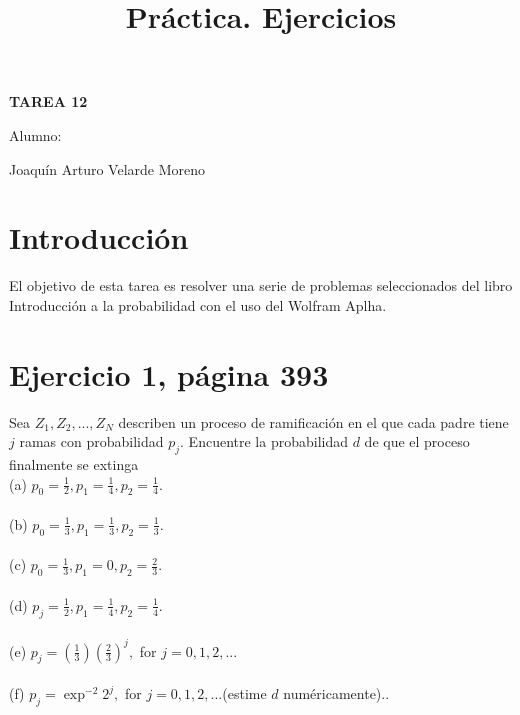 \documentclass[]{article}
\title{Práctica. Ejercicios}
\date{}
\begin{document}
	\maketitle
	\begin{center}


\centerline{\textbf{TAREA 12} } 
\textbf{ }

\centerline{Alumno: } 
\centerline{Joaquín Arturo Velarde Moreno}


	\end{center}
	

\section{Introducción}

El objetivo de esta tarea es resolver una serie de problemas seleccionados del libro Introducción a la probabilidad\cite{Material} con el uso del Wolfram Aplha\cite{wolf}.

\section{Ejercicio 1, página 393}


Sea $Z_{1}, Z_{2}, ..., Z_{N}$ describen un proceso de ramificación en el que cada padre tiene  $j$ ramas con probabilidad $p_{j}$. Encuentre la probabilidad  $d$ de que el proceso finalmente se extinga
\\
(a) $p_{0} = \frac{1}{2}, p_{1} = \frac{1}{4}, p_{2} = \frac{1}{4}$.\\
\\
(b) $p_{0} = \frac{1}{3}, p_{1} = \frac{1}{3}, p_{2} = \frac{1}{3}$.\\
\\
(c) $p_{0} = \frac{1}{3}, p_{1} = 0, p_{2} = \frac{2}{3}$.\\
\\
(d) $p_{j} = \frac{1}{2}, p_{1} = \frac{1}{4}, p_{2} = \frac{1}{4}$.\\
\\
(e) $p_{j} = (\frac{1}{3})(\frac{2}{3})^{j},$ for $j = 0, 1, 2, ...$\\
\\
(f) $p_{j} = \exp^{-2}2^{j},$ for $j = 0, 1, 2, ...$(estime $d$ numéricamente)..\\
\\
\end{document}
